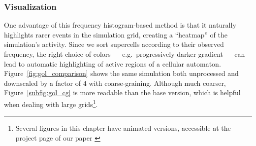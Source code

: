 \subsubsection{Visualization}
One advantage of this frequency histogram-based method is that it naturally
highlights rarer events in the simulation grid, creating a ``heatmap'' of the
simulation's activity. Since we sort supercells according to their observed
frequency, the right choice of colors --- e.g.\ progressively darker gradient ---
can lead to automatic highlighting of active regions of a cellular automaton.
Figure~\ref{fig:gol_comparison} shows the same simulation both unprocessed and
downscaled by a factor of 4 with coarse-graining. Although much coarser,
Figure~\ref{subfig:gol_cg} is more readable than the base version, which is
helpful when dealing with large grids\footnote{Several figures in this chapter
  have animated versions, accessible at the project page of our paper
  \parencite{cisnerosVisualizingComputationLargescale2020} \projecturl}.


